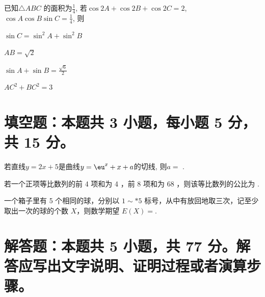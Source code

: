 \documentclass{exam-zh}
\begin{document}
\begin{question}
  已知$\triangle ABC$ 的面积为$\frac{1}{4}$, 若$\cos 2A + \cos 2B + \cos 2C = 2$,~ $\cos A \cos B \sin C = \frac{1}{4}$, 则 \paren
  \begin{choices}
    \item $\sin C = \sin^2 A + \sin^2 B$
    \item $AB = \sqrt{2}$
    \item $\sin A + \sin B = \frac{\sqrt{6}}{2}$
    \item $AC^2 + BC^2 = 3$
  \end{choices}
\end{question}






\section{填空题：本题共 3 小题，每小题 5 分，共 15 分。}

\begin{question}
  若直线$y=2x+5$是曲线$y=\eu^x +x+a$的切线, 则$a=$ \fillin.
\end{question}

\begin{question}
  若一个正项等比数列的前 4 项和为 4 ，前 8 项和为 68 ，则该等比数列的公比为 \fillin.
\end{question}

\begin{question}
  一个箱子里有 5 个相同的球，分别以 $1 \sim* 5$ 标号，从中有放回地取三次，记至少取出一次的球的个数 $X$，则数学期望 $E(X)=$\fillin.
\end{question}




\section{解答题：本题共 5 小题，共 77 分。解答应写出文字说明、证明过程或者演算步骤。}
\end{document}
